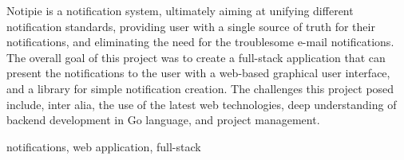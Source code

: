 \abstract
Notipie is a notification system,
ultimately aiming at unifying
different notification standards,
providing user with a single source of truth
for their notifications,
and eliminating the need
for the troublesome e-mail notifications.
The overall goal of this project
was to create a full-stack application
that can present the notifications to the user
with a web-based graphical user interface,
and a library
for simple notification creation.
The challenges this project posed include,
inter alia,
the use of the latest web technologies,
deep understanding of backend development in Go language,
and project management.

\keywords notifications, web application, full-stack
